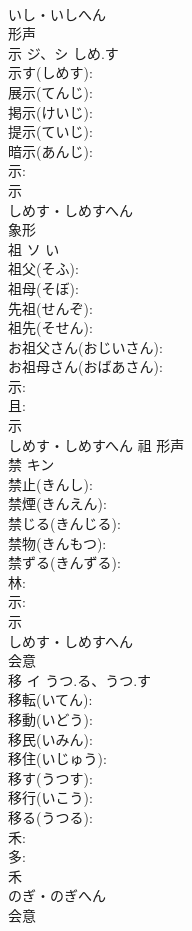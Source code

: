 \documentclass[8pt]{extreport}
\begin{document}
\begin{CJK}{UTF8}{min}
\\	いし・いしへん	
\\	形声 
\\	示	ジ、シ	しめ.す		
\\	示す(しめす): 
\\	展示(てんじ): 
\\	掲示(けいじ): 
\\	提示(ていじ): 
\\	暗示(あんじ): 
\\	示: 
\\	示	
\\	しめす・しめすへん	
\\	象形 
\\	祖	ソ		い	
\\	祖父(そふ): 
\\	祖母(そぼ): 
\\	先祖(せんぞ): 
\\	祖先(そせん): 
\\	お祖父さん(おじいさん): 
\\	お祖母さん(おばあさん): 
\\	示: 
\\	且: 
\\	示	
\\	しめす・しめすへん	祖	形声 
\\	禁	キン			
\\	禁止(きんし): 
\\	禁煙(きんえん): 
\\	禁じる(きんじる): 
\\	禁物(きんもつ): 
\\	禁ずる(きんずる): 
\\	林: 
\\	示: 
\\	示	
\\	しめす・しめすへん	
\\	会意 
\\	移	イ	うつ.る、うつ.す		
\\	移転(いてん): 
\\	移動(いどう): 
\\	移民(いみん): 
\\	移住(いじゅう): 
\\	移す(うつす): 
\\	移行(いこう): 
\\	移る(うつる): 
\\	禾: 
\\	多: 
\\	禾	
\\	のぎ・のぎへん	
\\	会意 

\end{CJK}
\end{document}
